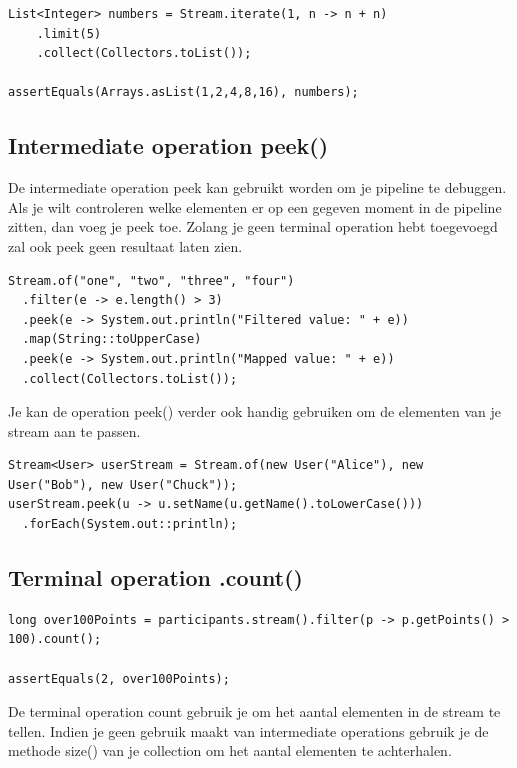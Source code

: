 \documentclass{tstextbook}
\begin{document}
\begin{lstlisting}
List<Integer> numbers = Stream.iterate(1, n -> n + n)
    .limit(5)
    .collect(Collectors.toList());

assertEquals(Arrays.asList(1,2,4,8,16), numbers);
\end{lstlisting}


\subsection{Intermediate operation peek()}

De intermediate operation peek kan gebruikt worden om je pipeline te debuggen. Als je wilt controleren welke elementen er op een gegeven moment in de pipeline zitten, dan voeg je peek toe. Zolang je geen terminal operation hebt toegevoegd zal ook peek geen resultaat laten zien.

\begin{lstlisting}
Stream.of("one", "two", "three", "four")
  .filter(e -> e.length() > 3)
  .peek(e -> System.out.println("Filtered value: " + e))
  .map(String::toUpperCase)
  .peek(e -> System.out.println("Mapped value: " + e))
  .collect(Collectors.toList());
\end{lstlisting}

Je kan de operation peek() verder ook handig gebruiken om de elementen van je stream aan te passen.

\begin{lstlisting}
Stream<User> userStream = Stream.of(new User("Alice"), new User("Bob"), new User("Chuck"));
userStream.peek(u -> u.setName(u.getName().toLowerCase()))
  .forEach(System.out::println);
  \end{lstlisting}


\subsection{Terminal operation .count()}

\begin{lstlisting}
long over100Points = participants.stream().filter(p -> p.getPoints() > 100).count();

assertEquals(2, over100Points);
\end{lstlisting}
		
De terminal operation count gebruik je om het aantal elementen in de stream te tellen.
Indien je geen gebruik maakt van intermediate operations gebruik je de methode size() van je collection om het aantal elementen te achterhalen.
\end{document}
